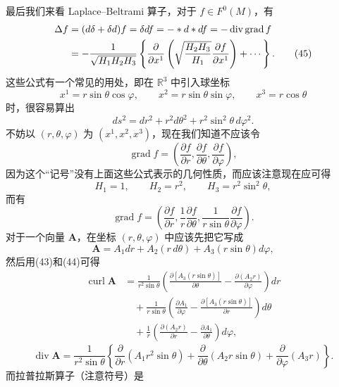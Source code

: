 最后我们来看 Laplace--Beltrami 算子，对于 $f\in F^0(M)$，有
\begin{align}
 \Delta f&=(d\delta+\delta d)f=\delta df=-*d*df=-\operatorname{div}\operatorname{grad}f\notag\\
 &=-\frac1{\sqrt{H_1H_2H_3}}
 \left\{\frac{\partial}{\partial x^1}\left(\sqrt{\frac{H_2H_3}{H_1}}\frac{\partial f}{\partial x^1}\right)+\cdots\right\}.
 \tag{45}
\end{align}
这些公式有一个常见的用处，即在 $\mathbb R^3$ 中引入球坐标
\[
 x^1=r\sin\theta\cos\varphi,\qquad
 x^2=r\sin\theta\sin\varphi,\qquad
 x^3=r\cos\theta
\]
时，很容易算出
\[
 ds^2=dr^2+r^2d\theta^2+r^2\sin^2\theta\,d\varphi^2.
\]
不妨以 $(r,\theta,\varphi)$ 为 $(x^1,x^2,x^3)$，现在我们知道不应该令
\[
 \operatorname{grad}f=\left(\frac{\partial f}{\partial r},\frac{\partial f}{\partial\theta},\frac{\partial f}{\partial\varphi}\right),
\]
因为这个“记号”没有上面这些公式表示的几何性质，而应该注意现在应可得
\[
 H_1=1,\qquad H_2=r^2,\qquad H_3=r^2\sin^2\theta,
\]
而有
\begin{equation}
 \operatorname{grad}f=
 \left(\frac{\partial f}{\partial r},\frac1r\frac{\partial f}{\partial\theta},\frac1{r\sin\theta}\frac{\partial f}{\partial\varphi}\right).
 \tag{46}
\end{equation}
对于一个向量 $\mathbf A$，在坐标 $(r,\theta,\varphi)$ 中应该先把它写成
\[
 \mathbf A=A_1dr+A_2(r\,d\theta)+A_3(r\sin\theta)d\varphi,
\]
然后用(43)和(44)可得
\begin{equation}
\begin{aligned}
 \operatorname{curl}\mathbf A
 &=\frac1{r^2\sin\theta}
 \left(\frac{\partial[A_3(r\sin\theta)]}{\partial\theta}-\frac{\partial(A_2r)}{\partial\varphi}\right)dr\\
 &\quad+\frac1{r\sin\theta}
 \left(\frac{\partial A_1}{\partial\varphi}-\frac{\partial[A_3(r\sin\theta)]}{\partial r}\right)d\theta\\
 &\quad+\frac1r
 \left(\frac{\partial(A_2r)}{\partial r}-\frac{\partial A_1}{\partial\theta}\right)d\varphi,
\end{aligned}
 \tag{47}
\end{equation}
\begin{equation}
 \operatorname{div}\mathbf A=
 \frac1{r^2\sin\theta}
 \left\{\frac{\partial}{\partial r}(A_1r^2\sin\theta)
 +\frac{\partial}{\partial\theta}(A_2r\sin\theta)
 +\frac{\partial}{\partial\varphi}(A_3r)\right\}.
 \tag{48}
\end{equation}
而拉普拉斯算子（注意符号）是
